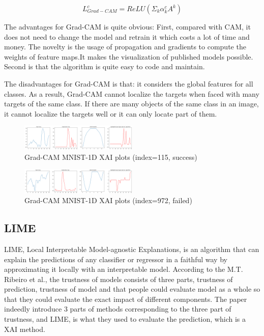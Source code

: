 \documentclass[conference]{IEEEtran}
\begin{document}
$$L_{Grad-CAM}^{c}=ReLU(\Sigma_{k}\alpha_{k}^{c}A^{k})$$

The advantages for Grad-CAM is quite obvious: First, compared with CAM, it does not need to change the model and retrain it which costs a lot of time and money. 
The novelty is the usage of propagation and gradients to compute the weights of feature maps.It makes the visualization of published models possible. Second is that the algorithm is quite easy to code and maintain.\par
The disadvantages for Grad-CAM is that: it considers the global features for all classes. As a result, Grad-CAM cannot localize the targets when faced with many targets of the same class. If there are many objects of the same class in an image, it cannot localize the targets well or it can only locate part of them.

\begin{figure}[h] 
    \centering
    \includegraphics[width=0.5\textwidth]{./pics/MNIST-1D/115T-L0P0/gradcam.png}
    \caption{Grad-CAM MNIST-1D XAI plots (index=115, success)} 
\end{figure}

\begin{figure}[h] 
    \centering
    \includegraphics[width=0.5\textwidth]{./pics/MNIST-1D/972F-L9P8/gradcam.png}
    \caption{Grad-CAM MNIST-1D XAI plots (index=972, failed)} 
\end{figure}

\subsection{LIME}

LIME, Local Interpretable Model-agnostic Explanations, is an algorithm that can explain the predictions of any classifier or regressor in a faithful way by approximating it locally with an interpretable model. According to the M.T. Ribeiro et al.\cite{b2}, the trustness of models consists of three parts, trustness of prediction, trustness of model and that people could evaluate model as a whole so that they could evaluate the exact impact of different components. The paper indeedly introduce 3 parts of methods corresponding to the three part of trustness, and LIME, is what they used to evaluate the prediction, which is a XAI method.
\end{document}
